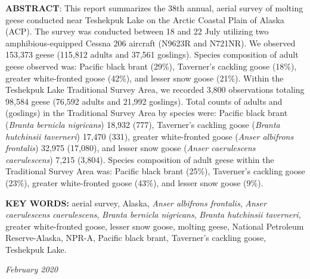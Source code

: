 \documentclass[
]{article}
\begin{document}
\textbf{ABSTRACT}: This report summarizes the 38th annual, aerial survey
of molting geese conducted near Teshekpuk Lake on the Arctic Coastal
Plain of Alaska (ACP). The survey was conducted between 18 and 22 July
utilizing two amphibious-equipped Cessna 206 aircraft (N9623R and
N721NR). We observed 153,373 geese (115,812 adults and 37,561 goslings).
Species composition of adult geese observed was: Pacific black brant
(29\%), Taverner's cackling goose (18\%), greater white-fronted goose
(42\%), and lesser snow goose (21\%). Within the Teshekpuk Lake
Traditional Survey Area, we recorded 3,800 observations totaling 98,584
geese (76,592 adults and 21,992 goslings). Total counts of adults and
(goslings) in the Traditional Survey Area by species were: Pacific black
brant (\textit{Branta bernicla nigricans}) 18,932 (777), Taverner's
cackling goose (\textit{Branta hutchinsii taverneri}) 17,470 (331),
greater white-fronted goose (\textit{Anser albifrons frontalis}) 32,975
(17,080), and lesser snow goose
(\textit{Anser caerulescens caerulescens}) 7,215 (3,804). Species
composition of adult geese within the Traditional Survey Area was:
Pacific black brant (25\%), Taverner's cackling goose (23\%), greater
white-fronted goose (43\%), and lesser snow goose (9\%).

\textbf{KEY WORDS: }aerial survey, Alaska,
\textit{Anser albifrons frontalis},
\textit{Anser caerulescens caerulescens},
\textit{Branta bernicla nigricans},
\textit{Branta hutchinsii taverneri}, greater white-fronted goose,
lesser snow goose, molting geese, National Petroleum Reserve-Alaska,
NPR-A, Pacific black brant, Taverner's cackling goose, Teshekpuk Lake.

\hfill\textit {February 2020}
\end{document}
